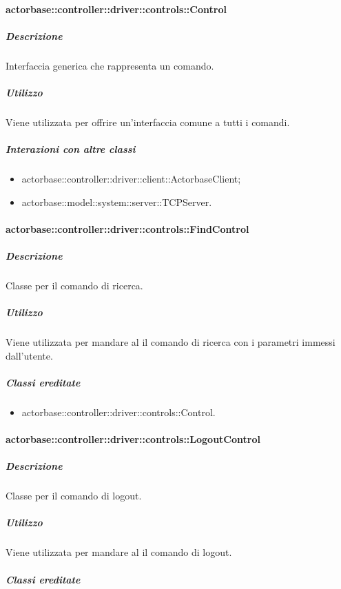 \documentclass{scalatekids-article}
\begin{document}
\paragraph{actorbase::controller::driver::controls::Control}

\subparagraph{Descrizione}

Interfaccia generica che rappresenta un comando.

\subparagraph{Utilizzo}

Viene utilizzata per offrire un'interfaccia comune a tutti i comandi.

\subparagraph{Interazioni con altre classi}

\begin{itemize}
\item actorbase::controller::driver::client::ActorbaseClient;
\item actorbase::model::system::server::TCPServer.
\end{itemize}

\paragraph{actorbase::controller::driver::controls::FindControl}

\subparagraph{Descrizione}

Classe per il comando di ricerca.

\subparagraph{Utilizzo}

Viene utilizzata per mandare al  il comando di ricerca con i parametri immessi dall'utente.

\subparagraph{Classi ereditate}

\begin{itemize}
\item actorbase::controller::driver::controls::Control.
\end{itemize}

\paragraph{actorbase::controller::driver::controls::LogoutControl}

\subparagraph{Descrizione}

Classe per il comando di logout.

\subparagraph{Utilizzo}

Viene utilizzata per mandare al  il comando di logout.

\subparagraph{Classi ereditate}
\end{document}
